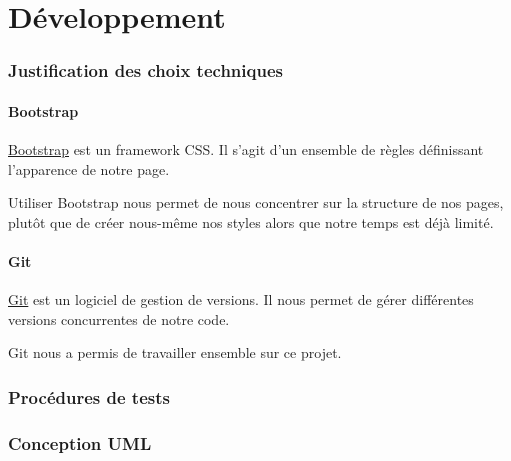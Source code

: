 \part{Développement}
\section{Justification des choix techniques}

	\subsection{Bootstrap}

		\href{http://getbootstrap.com/}{Bootstrap} est un framework CSS. Il s'agit d'un ensemble de règles définissant l'apparence de notre page.

		Utiliser Bootstrap nous permet de nous concentrer sur la structure de nos pages, plutôt que de créer nous-même nos styles alors que notre temps est déjà limité.

	\subsection{Git}

		\href{http://git-scm.com/}{Git} est un logiciel de gestion de versions. Il nous permet de gérer différentes versions concurrentes de notre code.

		Git nous a permis de travailler ensemble sur ce projet.

\section{Procédures de tests}

\clearpage
\section{Conception UML}
